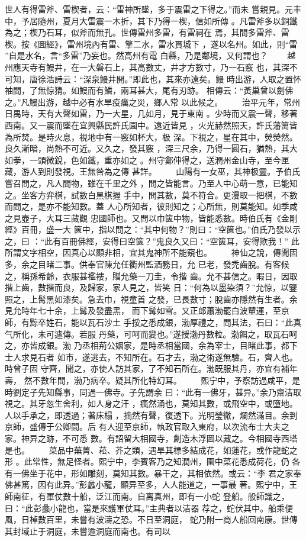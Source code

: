 \documentclass{ctexart}
\begin{document}
世人有得雷斧、雷楔者，云：``雷神所墜，多于震雷之下得之。''而未 嘗親見。元丰中，予居隨州，夏月大雷震一木折，其下乃得一楔，信如所傳 。凡雷斧多以銅鐵為之；楔乃石耳，似斧而無孔。世傳雷州多雷，有雷祠在 焉，其間多雷斧、雷楔。按《圖經》，雷州境內有雷、擎二水，雷水貫城下 ，遂以名州。如此，則``雷 ''自是水名，言``多雷''乃妄也。然高州有電 白縣，乃是鄰境，又何謂也？ 　　越州應天寺有鰻井，在一大磐石上，其高數丈，井才方數寸，乃一石竅 也，其深不可知，唐徐浩詩云：``深泉鰻井開。''即此也，其來亦遠矣。鰻 時出游，人取之置怀袖間，了無惊猜。如鰻而有鱗，兩耳甚大，尾有刃跡。 相傳云：``黃巢曾以劍佛之。''凡鰻出游，越中必有水旱疫癘之災，鄉人常 以此候之。 　　治平元年，常州日禺時，天有大聲如雷，乃一大星，几如月，見于東南 。少時而又震一聲，移著西南。又一震而墜在宜興縣民許氏園中。遠近皆見 ，火光赫然照天，許氏藩篱皆為所焚。是時火息，視地中有一竅如杯大，极 深。下視之，星在其中，熒熒然。良久漸暗，尚熱不可近。又久之，發其竅 ，深三尺余，乃得一圓石，猶熱，其大如拳，一頭微銳，色如鐵，重亦如之 。州守鄭伸得之，送潤州金山寺，至今匣藏，游人到則發視。王無咎為之傳 甚詳。 　　山陽有一女巫，其神极靈。予伯氏嘗召問之，凡人間物，雖在千里之外 ，問之皆能言。乃至人中心萌一意，已能知之。坐客方弈棋，試數白黑棋握 手中，問其數，莫不符合。更漫取一把棋，不數而問之，是亦不能知數。蓋 人心所知者，彼則知之；心所無，則莫能知。如季咸之見壺子，大耳三藏觀 忠國師也。又問以巾篋中物，皆能悉數。時伯氏有《金剛經》百冊，盛一大 篋中，指以問之：``其中何物？''則曰：``空篋也。''伯氏乃發以示之，曰 ：``此有百冊佛經，安得曰空篋？''鬼良久又曰：``空篋耳，安得欺我！'' 此所謂文字相空，因真心以顯非相，宜其鬼神所不能窺也。 　　神仙之說，傳聞固多，余之目睹二事。供奉官陳允任衢州監酒務日，允 已老，發禿齒脫。有客候之，稱孫希齡，衣服甚襤褸，贈允藥一刀圭，令揩 齒。允不甚信之。暇日，因取揩上齒，數揩而良，及歸家，家人見之，皆笑 日：``何為以墨染須？''允惊，以鑒照之，上髯黑如漆矣。急去巾，視童首 之發，已長數寸；脫齒亦隱然有生者。余見允時年七十余，上髯及發盡黑， 而下髯如雪。又正郎蕭渤罷白波輦運，至京師，有黥卒姓石，能以瓦石沙土 手挼之悉成銀，渤厚禮之，問其法，石曰：``此真气所化，未可遽傳。若服 丹藥，可呵而變也。''遂授渤丹數粒。渤餌之，取瓦石呵之，亦皆成銀。渤 乃丞相荊公姻家，是時丞相當國，余為宰士，目睹此事，都下士人求見石者 如市，遂逃去，不知所在。石才去，渤之術遂無驗。石，齊人也。時曾子固 守齊，聞之，亦使人訪其家，了不知石所在。渤既服其丹，亦宜有補年壽， 然不數年間，渤乃病卒。疑其所化特幻耳。 　　熙宁中，予察訪過咸平，是時劉定子先知縣事，同過一佛寺。子先謂余 曰：``此有一佛牙，甚异。''余乃齋洁取視之。其牙忽生舍利，如人身之汗 ，瘋然涌也，莫知其數，或飛空中，或墮地。人以手承之，即透過；著床榻 ，摘然有聲，復透下。光明瑩徹，爛然滿目。余到京師，盛傳于公卿間。后 有人迎至京師，執政官取入東府，以次流布士大夫之家。神异之跡，不可悉 數。有詔留大相國寺，創造木浮圖以藏之。今相國寺西塔是也。 　　菜品中蕪菁、菘、芥之類，遇旱其標多結成花，如蓮花，或作龍蛇之形 。此常性，無足怪者。熙宁中，李賓客乃之知潤州，園中菜花悉成荷花，仍 各有一佛坐于花中，形如雕刻，莫知其數。暴干之，其相依然。或云：``李 君之家奉佛甚篤，因有此异。''彭蠡小龍，顯异至多，人人能道之，一事最 著。熙宁中，王師南征，有軍仗數十船，泛江而南。自离真州，即有一小蛇 登船。般師識之，曰：``此彭蠡小龍也，當是來護軍仗耳。''主典者以洁器 荐之，蛇伏其中。船乘便風，日棹數百里，未嘗有波濤之恐。不日至洞庭， 蛇乃附一商人船回南康。世傳其封域止于洞庭，未嘗逾洞庭而南也。有司以 
\end{document}
